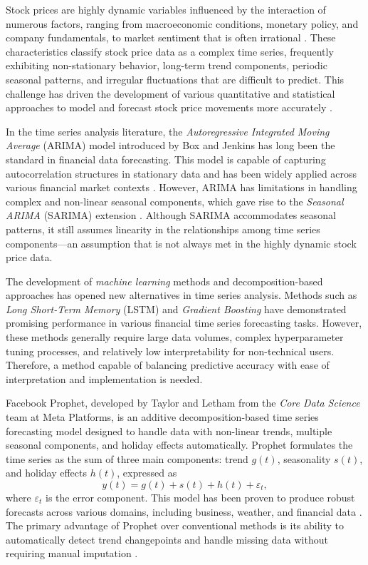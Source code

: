 \documentclass[11pt,twoside]{article}
\begin{document}
Stock prices are highly dynamic variables influenced by the interaction of numerous factors, ranging from macroeconomic conditions, monetary policy, and company fundamentals, to market sentiment that is often irrational \cite{Fama1970}. These characteristics classify stock price data as a complex time series, frequently exhibiting non-stationary behavior, long-term trend components, periodic seasonal patterns, and irregular fluctuations that are difficult to predict. This challenge has driven the development of various quantitative and statistical approaches to model and forecast stock price movements more accurately \cite{Box2015}.

In the time series analysis literature, the \textit{Autoregressive Integrated Moving Average} (ARIMA) model introduced by Box and Jenkins \cite{Box2015} has long been the standard in financial data forecasting. This model is capable of capturing autocorrelation structures in stationary data and has been widely applied across various financial market contexts \cite{Mondal2014}. However, ARIMA has limitations in handling complex and non-linear seasonal components, which gave rise to the \textit{Seasonal ARIMA} (SARIMA) extension \cite{Hyndman2018}. Although SARIMA accommodates seasonal patterns, it still assumes linearity in the relationships among time series components—an assumption that is not always met in the highly dynamic stock price data.

The development of \textit{machine learning} methods and decomposition-based approaches has opened new alternatives in time series analysis. Methods such as \textit{Long Short-Term Memory} (LSTM) \cite{Hochreiter1997} and \textit{Gradient Boosting} \cite{Chen2016} have demonstrated promising performance in various financial time series forecasting tasks. However, these methods generally require large data volumes, complex hyperparameter tuning processes, and relatively low interpretability for non-technical users. Therefore, a method capable of balancing predictive accuracy with ease of interpretation and implementation is needed.

Facebook Prophet, developed by Taylor and Letham \cite{Taylor2018} from the \textit{Core Data Science} team at Meta Platforms, is an additive decomposition-based time series forecasting model designed to handle data with non-linear trends, multiple seasonal components, and holiday effects automatically. Prophet formulates the time series as the sum of three main components: trend $g(t)$, seasonality $s(t)$, and holiday effects $h(t)$, expressed as
\begin{equation*}
    y(t) = g(t) + s(t) + h(t) + \varepsilon_t,
\end{equation*}
where $\varepsilon_t$ is the error component. This model has been proven to produce robust forecasts across various domains, including business, weather, and financial data \cite{Taylor2018}. The primary advantage of Prophet over conventional methods is its ability to automatically detect trend changepoints and handle missing data without requiring manual imputation \cite{Taylor2018}.
\end{document}
